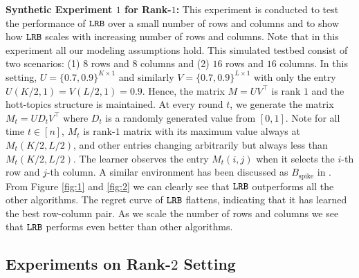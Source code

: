 \textbf{Synthetic Experiment $1$ for Rank-$1$:} This experiment is conducted to test the performance of ${\tt LRB}$ over a small number of rows and columns and to show how ${\tt LRB}$ scales with increasing number of rows and columns. Note that in this experiment all our modeling assumptions hold. This simulated testbed consist of two scenarios: (1) $8$ rows and $8$ columns and (2) $16$ rows and $16$ columns. In this setting, $U = \{0.7, 0.9\}^{K\times 1}$ and similarly $V = \{0.7, 0.9\}^{L\times 1}$ with only the entry $U(K/2,1) = V(L/2,1) = 0.9$. Hence, the matrix $M = UV^{\intercal}$ is rank $1$ and the hott-topics structure is maintained. At every round $t$, we generate the matrix $M_t = UD_tV^{\intercal}$ where $D_t$ is a randomly generated value from $[0,1]$. Note for all time $t\in [n]$, $M_t$ is rank-$1$ matrix with its maximum value always at $M_t(K/2,L/2)$, and other entries changing arbitrarily but always less than $M_t(K/2,L/2)$. The learner observes the entry $M_t(i,j)$ when it selects the $i$-th row and $j$-th column. A similar environment has been discussed as $B_{\text{spike}}$ in \citet{katariya2016stochastic}. From Figure \ref{fig:1} and \ref{fig:2} we can clearly see that ${\tt LRB}$ outperforms all the other algorithms. The regret curve of ${\tt LRB}$ flattens, indicating that it has learned the best row-column pair. As we scale the number of rows and columns we see that ${\tt LRB}$ performs even better than other algorithms. 

\subsection{Experiments on Rank-$2$ Setting}

